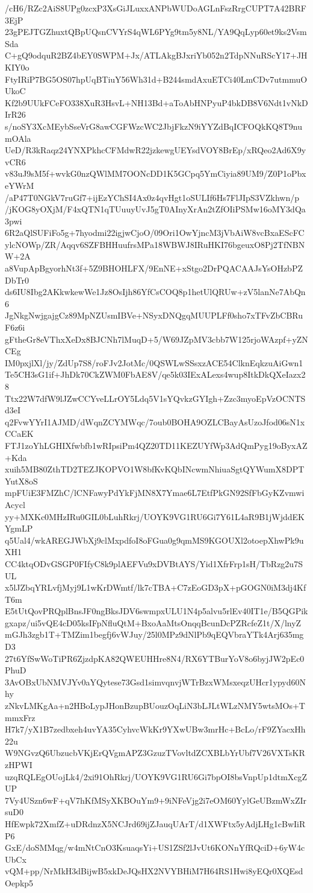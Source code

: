 /cH6/RZc2AiS8UPg0zcxP3XsGiJLuxxANPbWUDoAGLnFszRrgCUPT7A42BRF3EjP
23gPEJTGZhuxtQBpUQsnCVYrS4qWL6PYg9tm5y8NL/YA9QqLyp60et9ks2VsmSda
C+gQ9odquR2BZ4bEY0SWPM+Jx/ATLAkgBJxriYb052n2TdpNNuRScY17+JHKIY0o
FtyIRiP7BG5OS07hpUqBTiuY56Wh31d+B244smdAxuETCi40LmCDv7utmmuOUkoC
Kf2b9UUkFCeFO338XuR3HsvL+NH13Bd+aToAbHNPyuP4bkDB8V6Ndt1vNkDIrR26
s/noSY3XcMEybSseVrG8awCGFWzcWC2JbjFkzN9iYYZdBqICFOQkKQ8T9numOAla
UeD/R3kRaqz24YNXPkhcCFMdwR22jzkewgUEYsdVOY8BrEp/xRQeo2Ad6X9yvCR6
v83uJ9sM5f+wvkG0nzQWlMM7OONcDD1K5GCpq5YmCiyia89UM9/Z0P1oPbxeYWrM
/aP47T0NGkV7ruGf7+ijEzYChSI4Ax0z4qvHgt1oSULIf6Hs7FlJIpS3VZkhwn/p
/jKOG8yOXjM/F4xQTN1qTUuuyUvJ5gT0AInyXrAn2tZfOIiPSMw16oMY3dQa3pwi
6R2aQlSUFiFo5g+7hyodmi22igjwCjoO/09Ori1OwYjncM3jVbAiW8vcBxaEScFC
ylcNOWp/ZR/Aqqv6SZFBHHuufrsMPa18WBWJ8IRuHKI76bgeuxO8Pj2TfNBNW+2A
a8VupApBgyorhNt3f+5Z9BHOHLFX/9EnNE+xStgo2DrPQACAAJsYsOHzbPZDbTr0
ds6IU8Ibg2AKkwkewWe1Jz8OsIjh86YfCsCOQ8p1hetUlQRUw+zV5lanNe7AbQn6
JgNkgNwjgajgCz89MpNZUsmIBVe+NSyxDNQgqMUUPLFf0sho7xTFvZbCBRuF6z6i
gFtheGr8eVThxXeDx8BJCNh7lMuqD+5/W69JZpMV3cbb7W125rjoWAzpf+yZNCEg
IM0pxjlXl/jy/ZdUp7S8/roFJv2JotMc/0QSWLwSSsxzACE54ClknEqkzuAiGwn1
Te5CH3sG1if+JhDk70CkZWM0FbAE8V/qe5k03IExALexs4wup8ItkDkQXeIazx28
Ttx22W7dfW9lJZwCCYveLLrOY5Ldq5V1sYQvkzGYIgh+Zzc3myoEpVzOCNTSd3eI
q2FvwYYrI1AJMD/dWqnZCYMWqc/7oub0BOHA9OZLCBayAsUzoJfod06sN1xCCaEK
FTJ1zoYhLGHIXfwbfb1wRIpsiPm4QZ20TD11KEZUYfWp3AdQmPyg19oByxAZ+Kda
xuih5MB80ZthTD2TEZJKOPVO1W8bfKvKQbINcwmNhiuaSgtQYWumX8DPTYutX8oS
mpFUiE3FMZhC/lCNFawyPdYkFjMN8X7Ymae6L7EtfPkGN92SfFbGyKZvmwiAcycl
yy+MXKc0MHzIRu0GIL0bLuhRkrj/UOYK9VG1RU6Gi7Y61L4aR9B1jWjddEKYgmLP
q5Ual4/wkAREGJWbXj9clMxpdfoI8oFGua0g9qmMS9KGOUXl2otoepXhwPk9uXH1
CC4ktqODvGSGP0FIfyC8k9plAEFVu9xDVBtAYS/Yid1XfrFrp1sH/TbRzg2u7SUL
x5lJZbqYRLvfjMyj9L1wKrDWmtf/lk7cTBA+C7zEoGD3pX+pGOGN0iM3dj4KfT6m
E5tUtQovPRQplBnsJF0ngBksJDV6swmpxULU1N4p5alvu5rlEv40IT1e/B5QGPik
gxapz/ui5vQE4cD05ksIFpNfluQtM+BxoAaMtsOnqqBcunDcPZRcfeZ1t/X/lnyZ
mGJh3zgb1T+TMZim1begfj6vWJuy/25l0MPz9dNlPb9qEQVbraYTk4Arj635mgD3
27t6YfSwWoTiPR6ZjzdpKA82QWEUHHre8N4/RX6YTBurYoV8o6byjJW2pEc0PhuD
3AvOBxUbNMVJYv0aYQytese73Gsd1simvqnvjWTrBzxWMsxeqzUHcr1ypyd60Nhy
zNkvLMKgAa+n2HBoLypJHonBzupBUouzOqLiN3bLJLtWLzNMY5wtsMOs+TmmxFrz
H7k7/yX1B7zedbxeh4uvYA35CyhvcWkKr9YXwUBw3mrHc+BcLo/rF9ZYacxHh22u
W9NGvzQ6UbzucbVKjErQVgmAPZ3GzuzTVovltdZCXBLbYrUbf7V26VXTsKRzHPWI
uzqRQLEgOUojLk4/2xi91OhRkrj/UOYK9VG1RU6Gi7bpOI8bsVnpUp1dtmXcgZUP
7Vy4USzn6wF+qV7hKfMSyXKBOuYm9+9iNFeVjg2i7eOM60YylGeUBzmWxZIrsuD0
HfEwpk72XmfZ+uDRdnzX5NCJrd69ijZJauqUArT/d1XWFtx5yAdjLHg1cBwIiRP6
GxE/doSMMqg/w4mNtCnO3KsuaqsYi+US1ZSf2lJvUt6KONnYfRQciD+6yW4cUbCx
vQM+pp/NrMkH3dBijwB5xkDeJQsHX2NVYBHiM7H64RS1Hwi8yEQr0XQEsdOepkp5
